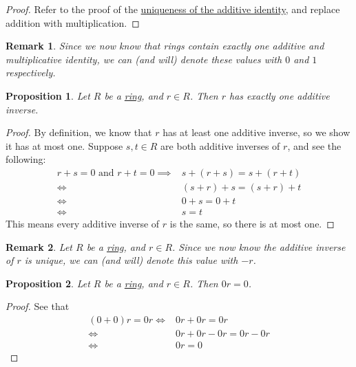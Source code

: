 \documentclass{scrartcl}
\theoremstyle{definition}
\theoremstyle{plain}
\newtheorem{proposition}{Proposition}[section]
\newtheorem{remark}{Remark}[section]
\begin{document}
\begin{proof}
    Refer to the proof of the \hyperref[prop:unique additive identity]{uniqueness of the additive identity}, and
    replace addition with multiplication.
\end{proof}

\begin{remark}
    Since we now know that rings contain exactly one additive and multiplicative identity, we can (and will) denote
    these values with $0$ and $1$ respectively.
\end{remark}

\begin{proposition}
    \label{prop:unique additive inverse}
    Let $R$ be a \hyperref[def:ring]{ring}, and $r\in R$.
    Then $r$ has exactly one additive inverse.
\end{proposition}

\begin{proof}
    By definition, we know that $r$ has at least one additive inverse, so we show it has at most one.
    Suppose $s,t\in R$ are both additive inverses of $r$, and see the following:
    \begin{align}
        r+s=0\text{ and }r+t=0
        \implies& s+(r+s)=s+(r+t) \\
        \iff& (s+r)+s=(s+r)+t \\
        \iff& 0+s=0+t \\
        \iff& s=t
    \end{align}
    This means every additive inverse of $r$ is the same, so there is at most one.
\end{proof}

\begin{remark}
    Let $R$ be a \hyperref[def:ring]{ring}, and $r\in R$.
    Since we now know the additive inverse of $r$ is unique, we can (and will) denote this value with $-r$.
\end{remark}

\begin{proposition}
    \label{prop:multiply by zero}
    Let $R$ be a \hyperref[def:ring]{ring}, and $r\in R$.
    Then $0r=0$.
\end{proposition}

\begin{proof}
    See that
    \begin{align}
        (0+0)r=0r
        \iff& 0r+0r=0r \\
        \iff& 0r+0r-0r=0r-0r \\
        \iff& 0r=0
    \end{align}
\end{proof}
\end{document}
